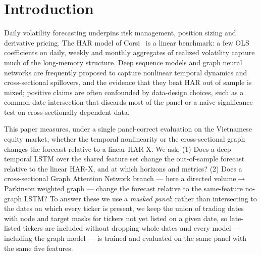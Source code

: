 \documentclass[runningheads]{llncs}
\begin{document}
\begin{abstract}
As an out-of-sample extension we apply the same configuration and protocol, without any retuning, to the broader
Vietnamese universe (the HOSE and HNX exchanges, 352 and 154 tickers): on the less-liquid HNX panel the deep and
graph models attain a significantly lower QLIKE than HAR-X at $h1$, $h10$ and $h22$ and the LSTM+GAT a
significantly lower QLIKE than the no-graph LSTM at $h10$ and $h22$, whereas on the more-liquid HOSE panel no
learned model differs significantly from HAR-X on QLIKE. As a developed-market
cross-check, the same protocol on the S\&P 500 (440 tickers) reproduces the liquid-market pattern: HAR-X has a
significantly lower QLIKE than the learned models at the short horizons, while the deep and graph models have
the lower squared and absolute error.
\end{abstract}

\section{Introduction}
Daily volatility forecasting underpins risk management, position sizing and derivative pricing. The HAR model
of Corsi~\cite{corsi2009} is a linear benchmark: a few OLS coefficients on daily, weekly and monthly
aggregates of realized volatility capture much of the long-memory structure. Deep sequence models and graph
neural networks are frequently proposed to capture nonlinear temporal dynamics and cross-sectional spillovers,
and the evidence that they beat HAR out of sample is mixed; positive claims are often confounded by
data-design choices, such as a common-date intersection that discards most of the panel or a naive
significance test on cross-sectionally dependent data.

This paper measures, under a single panel-correct evaluation on the Vietnamese equity market, whether the
temporal nonlinearity or the cross-sectional graph changes the forecast relative to a linear HAR-X. We ask: (1)
Does a deep temporal LSTM over the shared feature set change the out-of-sample forecast relative to the linear
HAR-X, and at which horizons and metrics? (2) Does a cross-sectional Graph Attention Network branch --- here a
directed volume$\to$Parkinson weighted graph --- change the forecast relative to the same-feature no-graph
LSTM? To answer these we use a \emph{masked panel}: rather than intersecting to the dates on
which every ticker is present, we keep the union of trading dates with node and target masks for tickers not
yet listed on a given date, so late-listed tickers are included without dropping whole dates and every model
--- including the graph model --- is trained and evaluated on the same panel with the same five features.
\end{document}
